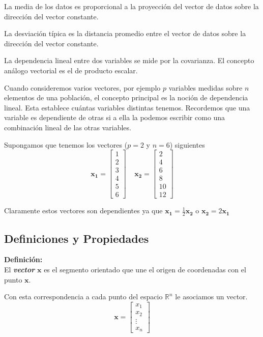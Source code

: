 \documentclass[12pt,letterpaper]{report} %
\begin{document}
La media de los datos es proporcional a la proyección del vector de datos sobre la dirección del vector constante.

La desviación típica es la distancia promedio entre el vector de datos sobre la dirección del vector constante.

La dependencia lineal entre dos variables se mide por la covarianza. El concepto análogo vectorial es el de producto escalar.

Cuando consideremos varios vectores, por ejemplo $p$ variables medidas sobre $n$ elementos de una población, el concepto principal es la noción de dependencia lineal. Esta establece cuántas variables distintas tenemos. Recordemos que una variable es dependiente de otras si a ella la podemos escribir como una combinación lineal de las otras variables.

Supongamos que tenemos los vectores ($p=2$ y $n=6$) siguientes
$$\mathbf{x_1}=\begin{bmatrix}1\\ 2 \\ 3 \\ 4 \\ 5 \\ 6 \end{bmatrix} \ \ \ \ \  \mathbf{x_2}=\begin{bmatrix} 2 \\ 4 \\ 6 \\ 8 \\ 10 \\ 12 \end{bmatrix}$$

Claramente estos vectores son dependientes ya que $\mathbf{x_1}=\frac{1}{2}\mathbf{x_2}$ o $\mathbf{x_2}=2\mathbf{x_1}$\\

\subsection{Definiciones y Propiedades}

\textbf{Definición:} \\

El \textit{\textbf{vector}} $\mathbf{x}$ es el segmento orientado que une el origen de coordenadas con el punto $\mathbf{x}$.

Con esta correspondencia a cada punto del espacio $\mathbb{R}^n$ le asociamos un vector.
$$
\mathbf{x}=\begin{bmatrix} x_1 \\ x_2 \\ \vdots \\ x_n\end{bmatrix}
$$
\end{document}
